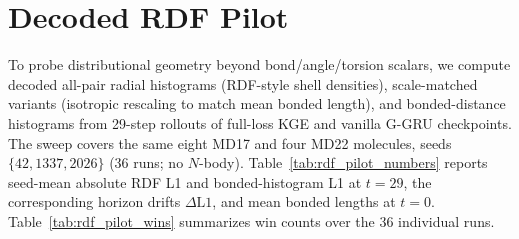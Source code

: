 \documentclass{article}
\newcommand{\GKE}{\textsc{KGE}}
\newcommand{\GGRU}{\textsc{G-GRU}}
\begin{document}
\section{Decoded RDF Pilot}
\label{app:rdf_pilot}

To probe distributional geometry beyond bond/angle/torsion scalars, we compute decoded all-pair radial histograms (RDF-style shell densities), scale-matched variants (isotropic rescaling to match mean bonded length), and bonded-distance histograms from 29-step rollouts of full-loss \GKE{} and vanilla \GGRU{} checkpoints.
The sweep covers the same eight MD17 and four MD22 molecules, seeds $\{42,1337,2026\}$ ($36$ runs; no $N$-body).
Table~\ref{tab:rdf_pilot_numbers} reports seed-mean absolute RDF L1 and bonded-histogram L1 at $t{=}29$, the corresponding horizon drifts $\Delta\mathrm{L1}$, and mean bonded lengths at $t{=}0$.
Table~\ref{tab:rdf_pilot_wins} summarizes win counts over the $36$ individual runs.
\end{document}
